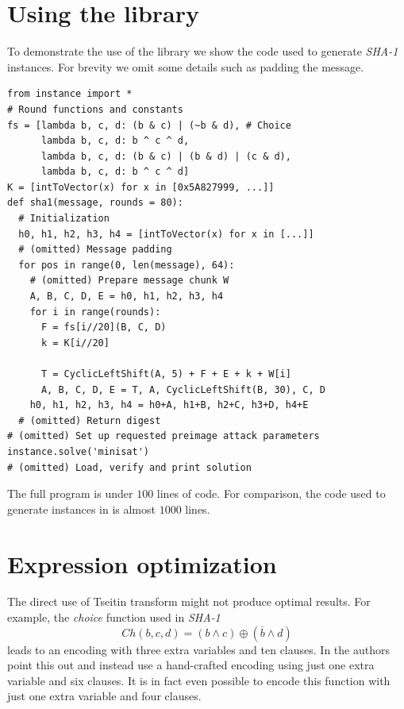 \documentclass[myposter,portrait]{sciposter}
\def\mysection#1{
{\color{sectionCol}\section*{\sc\bfseries #1}}}
\begin{document}
\begin{multicols*}{3}
\mysection{Using the library}
To demonstrate the use of the library we show the code used to generate \emph{SHA-1} instances.
For brevity we omit some details such as padding the message.
\begin{verbatim}
from instance import *
# Round functions and constants
fs = [lambda b, c, d: (b & c) | (~b & d), # Choice
      lambda b, c, d: b ^ c ^ d,
      lambda b, c, d: (b & c) | (b & d) | (c & d),
      lambda b, c, d: b ^ c ^ d]
K = [intToVector(x) for x in [0x5A827999, ...]]
def sha1(message, rounds = 80):
  # Initialization
  h0, h1, h2, h3, h4 = [intToVector(x) for x in [...]]
  # (omitted) Message padding
  for pos in range(0, len(message), 64):
    # (omitted) Prepare message chunk W
    A, B, C, D, E = h0, h1, h2, h3, h4
    for i in range(rounds):
      F = fs[i//20](B, C, D)
      k = K[i//20]
      
      T = CyclicLeftShift(A, 5) + F + E + k + W[i]
      A, B, C, D, E = T, A, CyclicLeftShift(B, 30), C, D
    h0, h1, h2, h3, h4 = h0+A, h1+B, h2+C, h3+D, h4+E
  # (omitted) Return digest
# (omitted) Set up requested preimage attack parameters
instance.solve('minisat')
# (omitted) Load, verify and print solution
\end{verbatim}
The full program is under $100$ lines of code.
For comparison, the code used to generate instances in \cite{nossum2012sat} is almost $1000$ lines.


\columnbreak
\mysection{Expression optimization}
The direct use of Tseitin transform might not produce optimal results.
For example, the \emph{choice} function used in \emph{SHA-1}
\[
Ch(b, c, d) = (b \land c) \oplus (\overline{b} \land d)
\]
leads to an encoding with three extra variables and ten clauses.
In \cite{nossum2012sat} the authors point this out and instead use a hand-crafted encoding using just one extra variable and six clauses.
It is in fact even possible to encode this function with just one extra variable and four clauses.
~\\


\end{multicols*}
\end{document}
